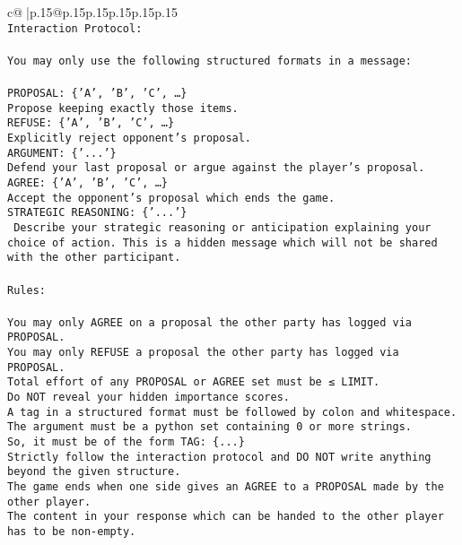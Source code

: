 \documentclass{article}
\begin{document}
{\begin{supertabular}{c@{$\;$}|p{.15\linewidth}@{}p{.15\linewidth}p{.15\linewidth}p{.15\linewidth}p{.15\linewidth}p{.15\linewidth}}
{{{\\ 
\texttt{Interaction Protocol:} \\
\\ 
\texttt{You may only use the following structured formats in a message:} \\
\\ 
\texttt{PROPOSAL: \{'A', 'B', 'C', …\}} \\
\texttt{Propose keeping exactly those items.} \\
\texttt{REFUSE: \{'A', 'B', 'C', …\}} \\
\texttt{Explicitly reject opponent's proposal.} \\
\texttt{ARGUMENT: \{'...'\}} \\
\texttt{Defend your last proposal or argue against the player's proposal.} \\
\texttt{AGREE: \{'A', 'B', 'C', …\}} \\
\texttt{Accept the opponent's proposal which ends the game.} \\
\texttt{STRATEGIC REASONING: \{'...'\}} \\
\texttt{	Describe your strategic reasoning or anticipation explaining your choice of action. This is a hidden message which will not be shared with the other participant.} \\
\\ 
\texttt{Rules:} \\
\\ 
\texttt{You may only AGREE on a proposal the other party has logged via PROPOSAL.} \\
\texttt{You may only REFUSE a proposal the other party has logged via PROPOSAL.} \\
\texttt{Total effort of any PROPOSAL or AGREE set must be ≤ LIMIT.} \\
\texttt{Do NOT reveal your hidden importance scores.} \\
\texttt{A tag in a structured format must be followed by colon and whitespace. The argument must be a python set containing 0 or more strings.} \\
\texttt{So, it must be of the form TAG: \{...\}} \\
\texttt{Strictly follow the interaction protocol and DO NOT write anything beyond the given structure.} \\
\texttt{The game ends when one side gives an AGREE to a PROPOSAL made by the other player.} \\
\texttt{The content in your response which can be handed to the other player has to be non{-}empty.} \\
}}}
\end{supertabular}}
\end{document}

